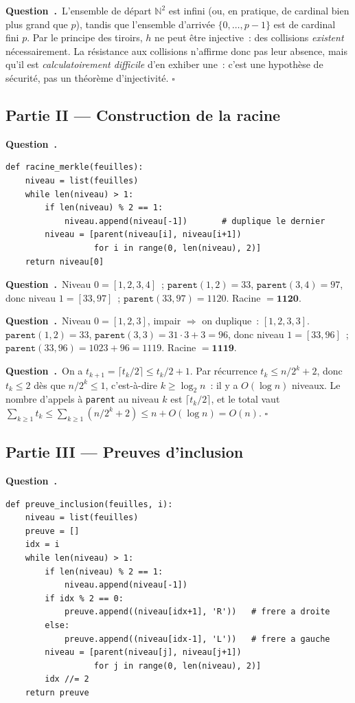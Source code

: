 \documentclass[11pt,a4paper]{article}
\newcounter{qcnt}
\newcommand{\Q}{\medskip\par\stepcounter{qcnt}\noindent\textbf{Question~\theqcnt.}~}
\newcommand{\code}[1]{\lstinline!#1!}
\begin{document}
\Q L'ensemble de départ $\mathbb{N}^2$ est infini (ou, en pratique, de cardinal bien plus grand
que $p$), tandis que l'ensemble d'arrivée $\{0,\dots,p-1\}$ est de cardinal fini $p$. Par le
principe des tiroirs, $h$ ne peut être injective~: des collisions \emph{existent}
nécessairement. La résistance aux collisions n'affirme donc pas leur absence, mais qu'il est
\emph{calculatoirement difficile} d'en exhiber une~: c'est une hypothèse de sécurité, pas un
théorème d'injectivité. $\square$

\subsection*{Partie II --- Construction de la racine}

\Q
\begin{lstlisting}
def racine_merkle(feuilles):
    niveau = list(feuilles)
    while len(niveau) > 1:
        if len(niveau) % 2 == 1:
            niveau.append(niveau[-1])       # duplique le dernier
        niveau = [parent(niveau[i], niveau[i+1])
                  for i in range(0, len(niveau), 2)]
    return niveau[0]
\end{lstlisting}

\Q Niveau $0=[1,2,3,4]$~; $\mathtt{parent}(1,2)=33$, $\mathtt{parent}(3,4)=97$, donc niveau
$1=[33,97]$~; $\mathtt{parent}(33,97)=1120$. Racine $=\mathbf{1120}$.

\Q Niveau $0=[1,2,3]$, impair $\Rightarrow$ on duplique~: $[1,2,3,3]$. $\mathtt{parent}(1,2)=33$,
$\mathtt{parent}(3,3)=31\cdot3+3=96$, donc niveau $1=[33,96]$~; $\mathtt{parent}(33,96)=1023+96=
1119$. Racine $=\mathbf{1119}$.

\Q On a $t_{k+1}=\lceil t_k/2\rceil \le t_k/2 + 1$. Par récurrence $t_k \le n/2^{k} + 2$, donc
$t_k \le 2$ dès que $n/2^{k}\le 1$, c'est-à-dire $k \ge \log_2 n$~: il y a $O(\log n)$ niveaux. Le
nombre d'appels à \code{parent} au niveau $k$ est $\lceil t_k/2\rceil$, et le total vaut
$\sum_{k\ge 1} t_k \le \sum_{k\ge1}(n/2^k + 2) \le n + O(\log n) = O(n)$. $\square$

\subsection*{Partie III --- Preuves d'inclusion}

\Q
\begin{lstlisting}
def preuve_inclusion(feuilles, i):
    niveau = list(feuilles)
    preuve = []
    idx = i
    while len(niveau) > 1:
        if len(niveau) % 2 == 1:
            niveau.append(niveau[-1])
        if idx % 2 == 0:
            preuve.append((niveau[idx+1], 'R'))   # frere a droite
        else:
            preuve.append((niveau[idx-1], 'L'))   # frere a gauche
        niveau = [parent(niveau[j], niveau[j+1])
                  for j in range(0, len(niveau), 2)]
        idx //= 2
    return preuve
\end{lstlisting}
\end{document}
